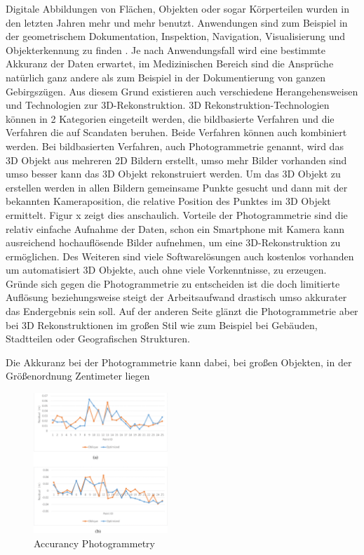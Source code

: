 \documentclass[../main.tex]{subfiles}
\begin{document}
Digitale Abbildungen von Flächen, Objekten oder sogar Körperteilen wurden in den
letzten Jahren mehr und mehr benutzt. Anwendungen sind zum Beispiel in der
geometrischem Dokumentation, Inspektion, Navigation, Visualisierung und 
Objekterkennung zu finden \cite{Verykokou.2023}. Je nach Anwendungsfall wird eine
bestimmte Akkuranz
der Daten erwartet, im Medizinischen Bereich sind die Ansprüche natürlich ganz 
andere als zum Beispiel in der Dokumentierung von ganzen Gebirgszügen.
Aus diesem Grund existieren auch verschiedene Herangehensweisen und Technologien  
zur 3D-Rekonstruktion.
3D Rekonstruktion-Technologien können in 2 Kategorien eingeteilt werden,
die bildbasierte Verfahren und die Verfahren die auf Scandaten 
beruhen. \cite{Verykokou.2023}
Beide Verfahren können auch kombiniert werden. 
Bei bildbasierten Verfahren, auch Photogrammetrie genannt, wird das 3D Objekt aus
mehreren 2D Bildern erstellt, umso mehr Bilder vorhanden sind umso besser kann das
3D Objekt rekonstruiert werden. Um das 3D Objekt zu erstellen werden in 
allen Bildern gemeinsame Punkte gesucht und dann mit der bekannten Kameraposition, 
die relative Position des Punktes im 3D Objekt ermittelt. Figur x zeigt dies 
anschaulich.
Vorteile der Photogrammetrie sind die relativ einfache Aufnahme der Daten, schon
ein Smartphone mit Kamera kann ausreichend hochauflösende Bilder aufnehmen, um 
eine 3D-Rekonstruktion zu ermöglichen. Des Weiteren sind viele Softwarelösungen
auch kostenlos vorhanden um automatisiert 3D Objekte, auch ohne viele 
Vorkenntnisse, zu erzeugen.
Gründe sich gegen die Photogrammetrie zu entscheiden ist die doch limitierte 
Auflösung beziehungsweise steigt der Arbeitsaufwand drastisch umso akkurater
das Endergebnis sein soll. Auf der anderen Seite glänzt die Photogrammetrie aber 
bei 3D Rekonstruktionen im großen Stil wie zum Beispiel bei Gebäuden, Stadtteilen
oder Geografischen Strukturen.

Die Akkuranz bei der Photogrammetrie kann dabei, bei großen Objekten, in der 
Größenordnung Zentimeter liegen \cite{10004712}

\begin{figure}[h]
    \centering
    \includegraphics[height=150pt]{images/photogammatry_accurancy.PNG}
    \caption{Accurancy Photogrammetry}
    \label{fig:photogammatryAccuracy}
\end{figure}
\end{document}
